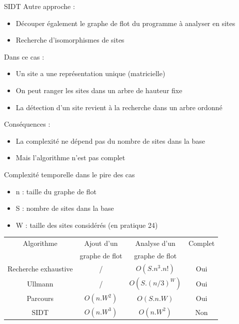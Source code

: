\documentclass{beamer}
\begin{document}
\begin{frame}{SIDT}
Autre approche :
 \begin{itemize}
  \item Découper également le graphe de flot du programme à analyser en sites
  \item Recherche d'isomorphismes de sites
 \end{itemize}
 
\pause
Dans ce cas :
\begin{itemize}
 \item Un site a une représentation unique (matricielle)
 \item On peut ranger les sites dans un arbre de hauteur fixe
 \item La détection d'un site revient à la recherche dans un arbre ordonné
\end{itemize}

\pause
Conséquences :
\begin{itemize}
 \item La complexité ne dépend pas du nombre de sites dans la base
 \item Mais l'algorithme n'est pas complet
\end{itemize}
\end{frame}


\begin{frame}{Complexité temporelle dans le pire des cas}
\begin{itemize}
 \item n : taille du graphe de flot
 \item S : nombre de sites dans la base
 \item W : taille des sites considérés (en pratique 24)
\end{itemize}

\begin{center}
\begin{tabular}{|c|c|c|c|}
 \hline
 Algorithme & Ajout d'un & Analyse d'un & Complet\\
   & graphe de flot & graphe de flot & \\
 \hline
 Recherche exhaustive & / & $O(S.n^3.n!)$ & Oui\\
 Ullmann & / & $O(S.(n/3)^W)$ & Oui \\
 Parcours & $O(n.W^2)$ & $O(S.n.W)$ & Oui\\
 SIDT & $O(n.W^3)$ & $O(n.W^2)$ & Non\\
 \hline
\end{tabular} 
\end{center}
\end{frame}
\end{document}
